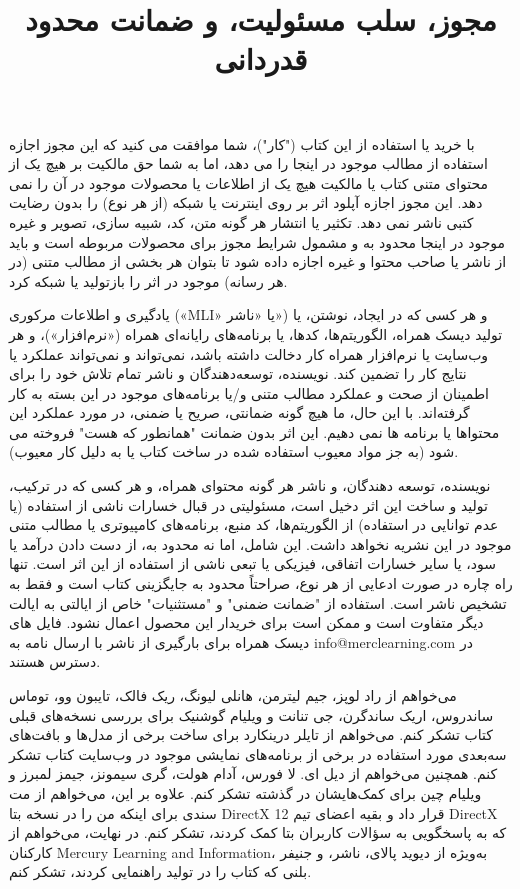 
    \title{
        \center \Huge
        مجوز، سلب مسئولیت، و ضمانت محدود \\[25pt]
    }

    {با خرید یا استفاده از این کتاب ("کار")، شما موافقت می کنید که این مجوز اجازه استفاده از مطالب موجود در اینجا را می دهد، اما به شما حق مالکیت بر هیچ یک از محتوای متنی کتاب یا مالکیت هیچ یک از اطلاعات یا محصولات موجود در آن را نمی دهد. این مجوز اجازه آپلود اثر بر روی اینترنت یا شبکه (از هر نوع) را بدون رضایت کتبی ناشر نمی دهد. تکثیر یا انتشار هر گونه متن، کد، شبیه سازی، تصویر و غیره موجود در اینجا محدود به و مشمول شرایط مجوز برای محصولات مربوطه است و باید از ناشر یا صاحب محتوا و غیره اجازه داده شود تا بتوان هر بخشی از مطالب متنی (در هر رسانه) موجود در اثر را بازتولید یا شبکه کرد.}

    {یادگیری و اطلاعات مرکوری («MLI» یا «ناشر») و هر کسی که در ایجاد، نوشتن، یا تولید دیسک همراه، الگوریتم‌ها، کدها، یا برنامه‌های رایانه‌ای همراه («نرم‌افزار»)، و هر وب‌سایت یا نرم‌افزار همراه کار دخالت داشته باشد، نمی‌تواند و نمی‌تواند عملکرد یا نتایج کار را تضمین کند. نویسنده، توسعه‌دهندگان و ناشر تمام تلاش خود را برای اطمینان از صحت و عملکرد مطالب متنی و/یا برنامه‌های موجود در این بسته به کار گرفته‌اند. با این حال، ما هیچ گونه ضمانتی، صریح یا ضمنی، در مورد عملکرد این محتواها یا برنامه ها نمی دهیم. این اثر بدون ضمانت "همانطور که هست" فروخته می شود (به جز مواد معیوب استفاده شده در ساخت کتاب یا به دلیل کار معیوب).}

    {نویسنده، توسعه دهندگان، و ناشر هر گونه محتوای همراه، و هر کسی که در ترکیب، تولید و ساخت این اثر دخیل است، مسئولیتی در قبال خسارات ناشی از استفاده (یا عدم توانایی در استفاده) از الگوریتم‌ها، کد منبع، برنامه‌های کامپیوتری یا مطالب متنی موجود در این نشریه نخواهد داشت. این شامل، اما نه محدود به، از دست دادن درآمد یا سود، یا سایر خسارات اتفاقی، فیزیکی یا تبعی ناشی از استفاده از این اثر است. تنها راه چاره در صورت ادعایی از هر نوع، صراحتاً محدود به جایگزینی کتاب است و فقط به تشخیص ناشر است. استفاده از "ضمانت ضمنی" و "مستثنیات" خاص از ایالتی به ایالت دیگر متفاوت است و ممکن است برای خریدار این محصول اعمال نشود. فایل های دیسک همراه برای بارگیری از ناشر با ارسال نامه به info@merclearning.com در دسترس هستند.}
    \newpage
    \title{
        \center \Huge
        قدردانی \\[25pt]
    }

    {می‌خواهم از راد لوپز، جیم لیترمن، هانلی لیونگ، ریک فالک، تایبون وو، توماس ساندروس، اریک ساندگرن، جی تنانت و ویلیام گوشنیک برای بررسی نسخه‌های قبلی کتاب تشکر کنم. می‌خواهم از تایلر درینکارد برای ساخت برخی از مدل‌ها و بافت‌های سه‌بعدی مورد استفاده در برخی از برنامه‌های نمایشی موجود در وب‌سایت کتاب تشکر کنم. همچنین می‌خواهم از دیل ای. لا فورس، آدام هولت، گری سیمونز، جیمز لمبرز و ویلیام چین برای کمک‌هایشان در گذشته تشکر کنم. علاوه بر این، می‌خواهم از مت سندی برای اینکه من را در نسخه بتا DirectX 12 قرار داد و بقیه اعضای تیم DirectX که به پاسخگویی به سؤالات کاربران بتا کمک کردند، تشکر کنم. در نهایت، می‌خواهم از کارکنان Mercury Learning and Information، به‌ویژه از دیوید پالای، ناشر، و جنیفر بلنی که کتاب را در تولید راهنمایی کردند، تشکر کنم.}
    \newpage
